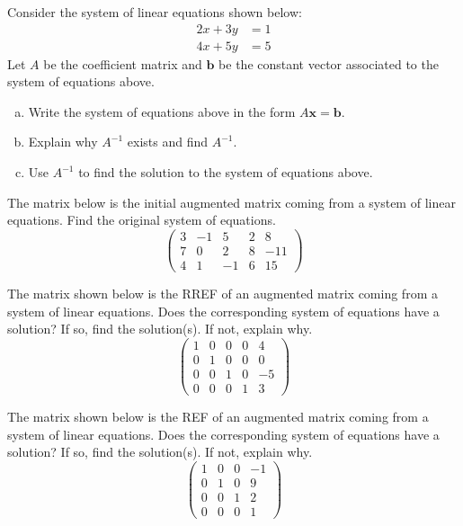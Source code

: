 \documentclass[12pt,letterpaper]{exam}
\begin{document}
\begin{questions}
\newpage
\question[10] Consider the system of linear equations shown below:
	\[
	\begin{aligned}
	2x + 3y&= 1 \\
	4x + 5y&= 5
	\end{aligned}
	\]
Let $A$ be the coefficient matrix and $\mathbf{b}$ be the constant vector associated to the system of equations above. 
        \begin{enumerate}[(a)]
        \item Write the system of equations above in the form $A\mathbf{x}= \mathbf{b}$. 
        \item Explain why $A^{-1}$ exists and find $A^{-1}$. 
        \item Use $A^{-1}$ to find the solution to the system of equations above. 
        \end{enumerate}



\newpage
\question[10] The matrix below is the initial augmented matrix coming from a system of linear equations. Find the original system of equations. 
	\[
	\begin{pmatrix} 3 & -1 & 5 & 2 & 8 \\ 7 & 0 & 2 & 8 & -11 \\ 4 & 1 & -1 & 6 & 15 \end{pmatrix}
	\]



\newpage
\question[10] The matrix shown below is the RREF of an augmented matrix coming from a system of linear equations. Does the corresponding system of equations have a solution? If so, find the solution(s). If not, explain why. 
	\[
	\begin{pmatrix}
	1 & 0 & 0 & 0 & 4 \\
	0 & 1 & 0 & 0 & 0 \\
	0 & 0 & 1 & 0 & -5 \\
	0 & 0 & 0 & 1 & 3
	\end{pmatrix}
	\]



\newpage
\question[10] The matrix shown below is the REF of an augmented matrix coming from a system of linear equations. Does the corresponding system of equations have a solution? If so, find the solution(s). If not, explain why. 
	\[
	\begin{pmatrix}
	1 & 0 & 0 & -1 \\
	0 & 1 & 0 & 9 \\
	0 & 0 & 1 & 2 \\
	0 & 0 & 0 & 1
	\end{pmatrix}
	\]




\end{questions}
\end{document}
